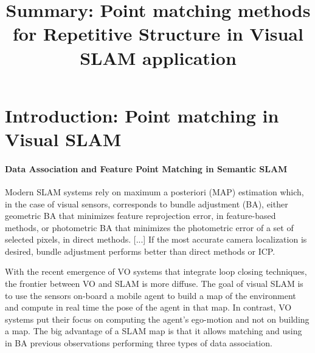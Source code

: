 \documentclass[review]{elsarticle}
\begin{document}
\begin{frontmatter}

\title{Summary: Point matching methods for Repetitive Structure in Visual SLAM application}

\begin{abstract}
\end{abstract}

\begin{keyword}
\end{keyword}

\end{frontmatter}

\linenumbers

\section{Introduction: Point matching in Visual SLAM}

\paragraph{Data Association and Feature Point Matching in Semantic SLAM} 
Modern SLAM systems rely on maximum a posteriori (MAP) estimation which, in the case of visual sensors, corresponds to bundle adjustment (BA), either geometric BA that minimizes feature reprojection error, in feature-based methods, or photometric BA that minimizes the photometric error of a set of selected pixels, in direct methods. [...] If the most accurate camera localization is desired, bundle adjustment performs better than direct methods or ICP.

With the recent emergence of VO systems that integrate loop closing techniques, the frontier between VO and SLAM is more diffuse. 
The goal of visual SLAM is to use the sensors on-board a mobile agent to build a map of the environment and compute in real time the pose of the agent in that map. 
In contrast, VO systems put their focus on computing the agent’s ego-motion and not on building a map. 
The big advantage of a SLAM map is that it allows matching and using in BA previous observations performing three types of data association.
\end{document}
